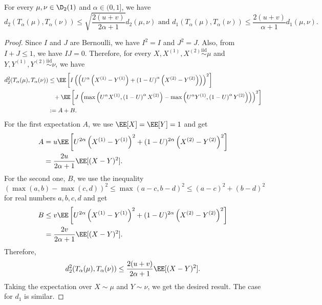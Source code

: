 \begin{lemma}
  \label{lem:collapse-one-step}
  For every $\mu,\nu\in \D_2(1)$ and $\alpha\in(0,1]$, we have
  $$d_2(T_\alpha(\mu), T_\alpha(\nu)) \le \sqrt{\dfrac{2(u+v)}{2\alpha+1}}d_2(\mu, \nu) \text{ and } d_1(T_\alpha(\mu), T_\alpha(\nu)) \le \dfrac{2(u+v)}{\alpha+1}d_1(\mu, \nu).$$
\end{lemma}

\begin{proof}
  Since $I$ and $J$ are Bernoulli, we have $I^2 = I$ and $J^2 = J$. Also, from $I+J\le 1$, we have $IJ = 0$. Therefore, for every $X,X^{(1)},X^{(2)}\stackrel{\text{iid}}{\sim}\mu$ and $Y,Y^{(1)},Y^{(2)}\stackrel{\text{iid}}{\sim}\nu$, we have
  \begin{align*}
    d_2^2(T_\alpha(\mu), T_\alpha(\nu))
     & \le \EE\left[I\left(\left(U^\alpha\left(X^{(1)}-Y^{(1)}\right) + \left(1-U\right)^\alpha\left(X^{(2)}-Y^{(2)}\right)\right)\right)^2\right]                                                      \\
     & \,\,\,\,\,+\EE \left[J\left.\left(\max\left(U^\alpha X^{(1)}, \left(1-U\right)^\alpha X^{(2)}\right) - \max\left(U^\alpha Y^{(1)}, \left(1-U\right)^\alpha Y^{(2)}\right)\right)\right)^2\right] \\
     & := A+B.
  \end{align*}
  For the first expectation $A$, we use $\EE[X] = \EE[Y] = 1$ and get
  \begin{align*}
    A
     & = u\EE\left[U^{2\alpha}\left(X^{(1)}-Y^{(1)}\right)^2 + (1-U)^{2\alpha}\left(X^{(2)}-Y^{(2)}\right)^2 \right] \\
     & = \dfrac{2u}{2\alpha+1}\EE[(X-Y)^2].
  \end{align*}
  For the second one, $B$, we use the inequality
  $$(\max(a,b) - \max(c,d))^2 \le \max(a-c, b-d)^2 \le (a-c)^2+(b-d)^2$$
  for real numbers $a,b,c,d$ and get
  \begin{align*}
    B
     & \le v\EE\left[U^{2\alpha}\left(X^{(1)}-Y^{(1)}\right)^2 + (1-U)^{2\alpha}\left(X^{(2)}-Y^{(2)}\right)^2 \right] \\
     & = \dfrac{2v}{2\alpha+1}\EE[(X-Y)^2].
  \end{align*}
  Therefore,
  $$d_2^2(T_\alpha(\mu), T_\alpha(\nu)) \le \dfrac{2(u+v)}{2\alpha+1}\EE[(X-Y)^2].$$
  Taking the expectation over $X\sim\mu$ and $Y\sim\nu$, we get the desired result. The case for $d_1$ is similar.
\end{proof}

